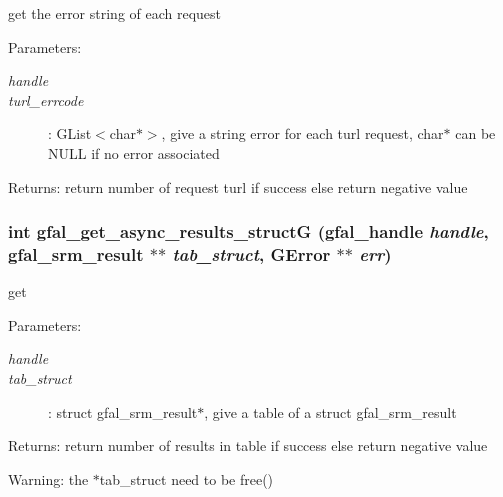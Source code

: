 get the error string of each request 

\begin{Desc}
\item[Parameters:]
\begin{description}
\item[{\em handle}]\item[{\em turl\_\-errcode}]: GList$<$char$\ast$$>$, give a string error for each turl request, char$\ast$ can be NULL if no error associated \end{description}
\end{Desc}
\begin{Desc}
\item[Returns:]return number of request turl if success else return negative value \end{Desc}
\subsubsection{\setlength{\rightskip}{0pt plus 5cm}int gfal\_\-get\_\-async\_\-results\_\-struct\-G (gfal\_\-handle {\em handle}, gfal\_\-srm\_\-result $\ast$$\ast$ {\em tab\_\-struct}, GError $\ast$$\ast$ {\em err})}\label{gfal__common__srm_8h_171b068add7188f1c08509edf5f4b01d}


get 

\begin{Desc}
\item[Parameters:]
\begin{description}
\item[{\em handle}]\item[{\em tab\_\-struct}]: struct gfal\_\-srm\_\-result$\ast$, give a table of a struct gfal\_\-srm\_\-result \end{description}
\end{Desc}
\begin{Desc}
\item[Returns:]return number of results in table if success else return negative value \end{Desc}
\begin{Desc}
\item[Warning:]the $\ast$tab\_\-struct need to be free() \end{Desc}
